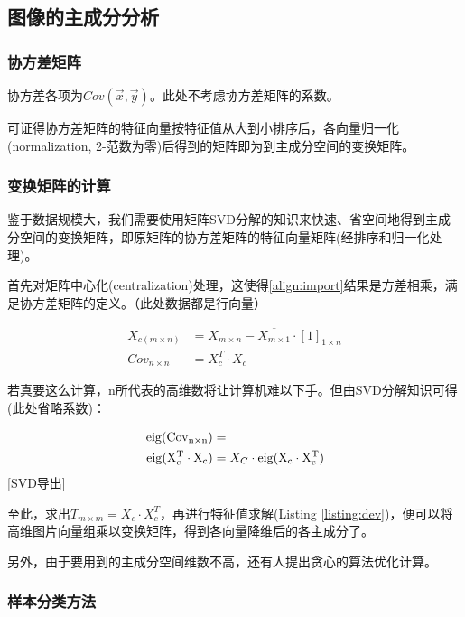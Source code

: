 \subsection{图像的主成分分析}

\subsubsection{协方差矩阵}

协方差各项为$Cov(\vec x, \vec y)$。此处不考虑协方差矩阵的系数。

可证得协方差矩阵的特征向量按特征值从大到小排序后，各向量归一化(normalization, 2-范数为零)后得到的矩阵即为到主成分空间的变换矩阵。

\subsubsection{变换矩阵的计算}

鉴于数据规模大，我们需要使用矩阵SVD分解的知识来快速、省空间地得到主成分空间的变换矩阵，即原矩阵的协方差矩阵的特征向量矩阵(经排序和归一化处理)。

首先对矩阵中心化(centralization)处理，这使得\autoref{align:import}结果是方差相乘，满足协方差矩阵的定义。（此处数据都是行向量）

\begin{align}
    X_{c(m\times n)} &= X_{m\times n} - \overline{X_{m\times 1}} \cdot [1]_{1\times n} \\
    Cov_{n \times n} &= X^T_c \cdot X_c \label{align:import}
\end{align}

若真要这么计算，n所代表的高维数将让计算机难以下手。但由SVD分解知识可得(此处省略系数)：

\begin{align}
\begin{split}
    \rm{eig}(Cov_{n \times n}) &= \\
    \rm{eig}(X^T_c \cdot X_c) &= X_C \cdot \rm{eig}(X_c \cdot X^T_c)
\end{split}
\end{align}[SVD导出]

至此，求出$ T_{m \times m} = X_c \cdot X^T_c $，再进行特征值求解(Listing \ref{listing:dev})，便可以将高维图片向量组乘以变换矩阵，得到各向量降维后的各主成分了。\cite{Abdi_2010, orfanidis_2007, Wold_1987, Pearson_1901}

另外，由于要用到的主成分空间维数不高，还有人提出贪心的算法优化计算。\cite{王晓伟_2013}

\subsubsection{样本分类方法}


